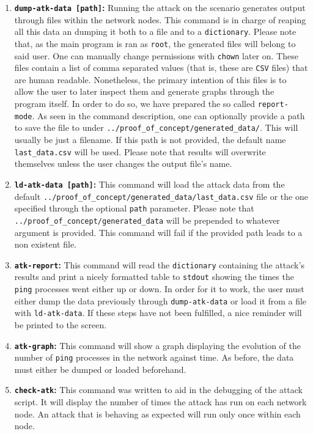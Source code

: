 \begin{enumerate}
                    \item \textbf{\texttt{dump-atk-data [path]}:} Running the attack on the scenario generates output through files within the network nodes. This command is in charge of reaping all this data an dumping it both to a file and to a \texttt{dictionary}. Please note that, as the main program is ran as \texttt{root}, the generated files will belong to said user. One can manually change permissions with \texttt{chown} later on. These files contain a list of comma separated values (that is, these are \texttt{CSV} files) that are human readable. Nonetheless, the primary intention of this files is to allow the user to later inspect them and generate graphs through the program itself. In order to do so, we have prepared the so called \texttt{report-mode}. As seen in the command description, one can optionally provide a path to save the file to under \texttt{\allowbreak ../proof\_of\_concept/generated\_data/}. This will usually be just a filename. If this path is not provided, the default name \texttt{last\_data.csv} will be used. Please note that results will overwrite themselves unless the user changes the output file's name.
                    \item \textbf{\texttt{ld-atk-data [path]}:} This command will load the attack data from the default \texttt{\allowbreak../proof\_of\_concept/generated\_data/last\_data.csv} file or the one specified through the optional \texttt{path} parameter. Please note that \texttt{\allowbreak ../proof\_of\_concept/generated\_data} will be prepended to whatever argument is provided. This command will fail if the provided path leads to a non existent file.
                    \item \textbf{\texttt{atk-report}:} This command will read the \texttt{dictionary} containing the attack's results and print a nicely formatted table to \texttt{stdout} showing the times the \texttt{ping} processes went either up or down. In order for it to work, the user must either dump the data previously through \texttt{dump-atk-data} or load it from a file with \texttt{ld-atk-data}. If these steps have not been fulfilled, a nice reminder will be printed to the screen.
                    \item \textbf{\texttt{atk-graph}:} This command will show a graph displaying the evolution of the number of \texttt{ping} processes in the network against time. As before, the data must either be dumped or loaded beforehand.
                    \item \textbf{\texttt{check-atk}:} This command was written to aid in the debugging of the attack script. It will display the number of times the attack has run on each network node. An attack that is behaving as expected will run only once within each node.

\end{enumerate}
